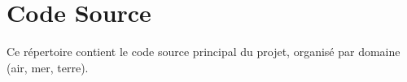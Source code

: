 \chapter{Code Source}
\hypertarget{md_src_2README}{}\label{md_src_2README}
\label{md_src_2README_autotoc_md0}%
%
 Ce répertoire contient le code source principal du projet, organisé par domaine (air, mer, terre).